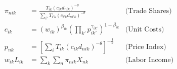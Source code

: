 \begin{align*}
    \pi_{nik} &= \frac{T_{ik} (c_{ik} d_{nik})^{-\theta}}{\sum_{i'} T_{i'k} (c_{i'k} d_{ni'k})^{-\theta}} & \text{(Trade Shares)} \\
    c_{ik} &= (w_{ik})^{\beta_{ik}} \left(\prod_{k'} p_{ik'}^{\gamma_{ik'}}\right)^{1 - \beta_{ik}} & \text{(Unit Costs)} \\
    p_{nk} &= \left[ \sum_{i} T_{ik} (c_{ik} d_{nik})^{-\theta} \right]^{-\frac{1}{\theta}} & \text{(Price Index)} \\
    w_{ik} L_{ik} &= \sum_{k} \sum_{n} \pi_{nik} X_{nk} & \text{(Labor Income)} \\
\end{align*}
